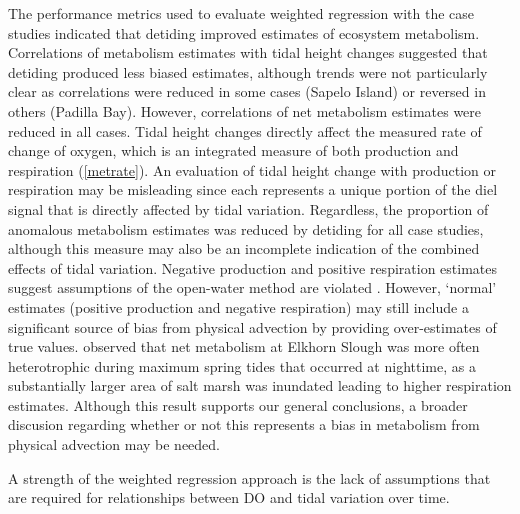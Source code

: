 The performance metrics used to evaluate weighted regression with the case studies indicated that detiding improved estimates of ecosystem metabolism.  Correlations of metabolism estimates with tidal height changes suggested that detiding produced less biased estimates, although trends were not particularly clear as correlations were reduced in some cases (Sapelo Island) or reversed in others (Padilla Bay).  However, correlations of net metabolism estimates were reduced in all cases.  Tidal height changes directly affect the measured rate of change of oxygen, which is an integrated measure of both production and respiration (\cref{metrate}).  An evaluation of tidal height change with production or respiration may be misleading since each represents a unique portion of the diel  signal that is directly affected by tidal variation.  Regardless, the proportion of anomalous metabolism estimates was reduced by detiding for all case studies, although this measure may also be an incomplete indication of the combined effects of tidal variation.  Negative production and positive respiration estimates suggest assumptions of the open-water method are violated \citep{Needoba12}.  However, `normal' estimates (positive production and negative respiration) may still include a significant source of bias from physical advection by providing over-estimates of true values.  \citet{Nidzieko14} observed that net metabolism at Elkhorn Slough was more often heterotrophic during maximum spring tides that occurred at nighttime, as a substantially larger area of salt marsh was inundated leading to higher respiration estimates.  Although this result supports our general conclusions, a broader discusion regarding whether or not this represents a bias in metabolism from physical advection may be needed. 

A strength of the weighted regression approach is the lack of assumptions that are required for relationships between \ac{DO} and tidal variation over time. 



